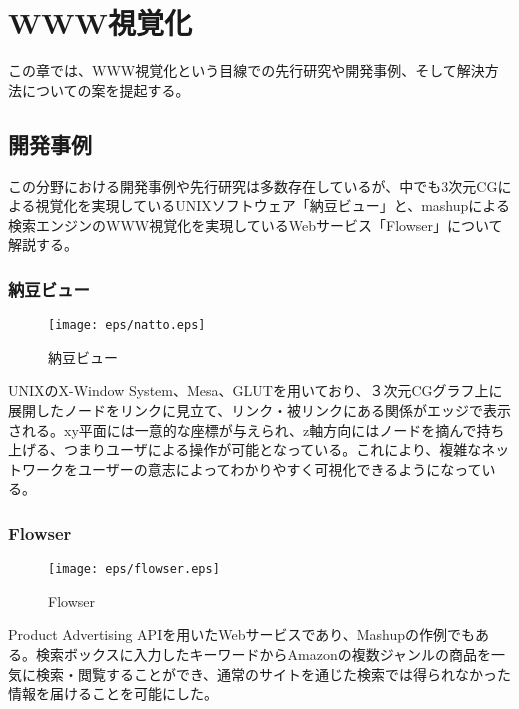 \chapter{WWW視覚化}
\label{chap:visualize}

この章では、WWW視覚化という目線での先行研究や開発事例、そして解決方法についての案を提起する。

\section{開発事例}
この分野における開発事例や先行研究は多数存在しているが、中でも3次元CGによる視覚化を実現しているUNIXソフトウェア「納豆ビュー\cite{natto}」と、mashupによる検索エンジンのWWW視覚化を実現しているWebサービス「Flowser\cite{flowser}」について解説する。

\subsection{納豆ビュー}
\begin{figure}[htbp]
\begin{center}
\texttt{[image: eps/natto.eps]}
\caption{納豆ビュー}
\label{納豆ビュー}
\end{center}
\end{figure}
UNIXのX-Window System、Mesa、GLUTを用いており、３次元CGグラフ上に展開したノードをリンクに見立て、リンク・被リンクにある関係がエッジで表示される。xy平面には一意的な座標が与えられ、z軸方向にはノードを摘んで持ち上げる、つまりユーザによる操作が可能となっている。これにより、複雑なネットワークをユーザーの意志によってわかりやすく可視化できるようになっている。

\subsection{Flowser}
\begin{figure}[htbp]
\begin{center}
\texttt{[image: eps/flowser.eps]}
\caption{Flowser}
\label{flowser}
\end{center}
\end{figure}
Product Advertising APIを用いたWebサービスであり、Mashupの作例でもある。検索ボックスに入力したキーワードからAmazonの複数ジャンルの商品を一気に検索・閲覧することができ、通常のサイトを通じた検索では得られなかった情報を届けることを可能にした。

